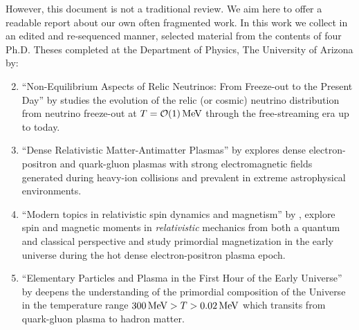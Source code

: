 However, this document is not a traditional review. We aim here to offer a readable report about our own often fragmented work. In this work we collect in an edited and re-sequenced manner, selected material from the contents of four Ph.D. Theses completed at the Department of Physics, The University of Arizona by:
\begin{enumerate}
\setcounter{enumi}{1}
\item ``Non-Equilibrium Aspects of Relic Neutrinos: From Freeze-out to the Present Day'' by  studies the evolution of the relic (or cosmic) neutrino distribution from neutrino freeze-out at $T=\mathcal{O}(1)\text{\,MeV}$ through the free-streaming era up to today.
%
\item ``Dense Relativistic Matter-Antimatter Plasmas'' by  explores dense electron-positron and quark-gluon plasmas with strong electromagnetic fields generated during heavy-ion collisions and prevalent in extreme astrophysical environments.
%
\item ``Modern topics in relativistic spin dynamics and magnetism'' by , explore spin and magnetic moments in \emph{relativistic} mechanics from both a quantum and classical perspective and study primordial magnetization in the early universe during the hot dense electron-positron plasma epoch.
%
\item ``Elementary Particles and Plasma in the First Hour of the Early Universe'' by  deepens the understanding of the primordial composition of the Universe in the temperature range $300 \text{\,MeV}>T>0.02\text{\,MeV}$ which transits from quark-gluon plasma to hadron matter.
\end{enumerate}

